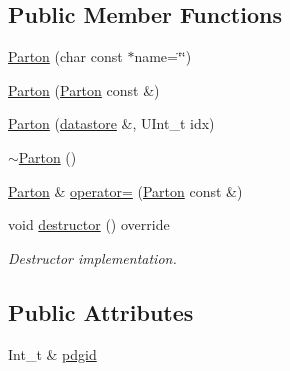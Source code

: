 \subsection*{Public Member Functions}
\begin{DoxyCompactItemize}
\item 
\hyperlink{classpanda_1_1Parton_a35d82b5fdf37ff12e17c2491dbd188b5}{Parton} (char const $\ast$name=\char`\"{}\char`\"{})
\item 
\hyperlink{classpanda_1_1Parton_a95d82e4fc54a04ec13ae894134c834d5}{Parton} (\hyperlink{classpanda_1_1Parton}{Parton} const \&)
\item 
\hyperlink{classpanda_1_1Parton_a1ec13895afc9363dde4ad087f872d1b3}{Parton} (\hyperlink{structpanda_1_1Element_1_1datastore}{datastore} \&, UInt\_\-t idx)
\item 
\hyperlink{classpanda_1_1Parton_a5cb68db7a6813b2403a918d303c04e53}{$\sim$Parton} ()
\item 
\hyperlink{classpanda_1_1Parton}{Parton} \& \hyperlink{classpanda_1_1Parton_a0def202110cf69ff7d9213cbf9db02ec}{operator=} (\hyperlink{classpanda_1_1Parton}{Parton} const \&)
\item 
void \hyperlink{classpanda_1_1Parton_a54783d8795081067290078d39305e21c}{destructor} () override
\begin{DoxyCompactList}\small\item\em Destructor implementation. \item\end{DoxyCompactList}\end{DoxyCompactItemize}
\subsection*{Public Attributes}
\begin{DoxyCompactItemize}
\item 
Int\_\-t \& \hyperlink{classpanda_1_1Parton_addc28c89761706cb6a9b88c4d910f542}{pdgid}
\end{DoxyCompactItemize}
